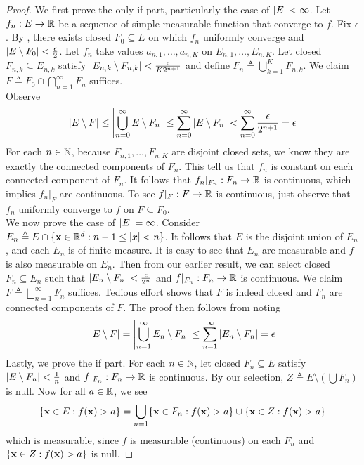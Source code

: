 \documentclass{report}
\begin{document}
\begin{proof}
We first prove the only if part, particularly the case of $\left|E\right|<\infty$. Let $f_n:E\rightarrow \mathbb{R}$ be a sequence of simple measurable function that converge to  $f$. Fix $\epsilon $. By , there exists closed $F_0\subseteq E$ on which $f_n$ uniformly converge and  $\left|E\setminus F_0\right|< \frac{\epsilon}{2}$. Let $f_n$ take values  $a_{n,1},\dots ,a_{n,K}$ on $E_{n,1},\dots ,E_{n,K}$. Let closed $F_{n,k}\subseteq E_{n,k}$ satisfy $\left|E_{n,k} \setminus F_{n,k}\right|< \frac{\epsilon }{K2^{n+1}}$ and define $F_n\triangleq \bigcup_{k=1}^K F_{n,k}$. We claim $F\triangleq F_0\cap \bigcap_{n=1}^{\infty}F_n$ suffices.\\

Observe 
\begin{align*}
\left|E\setminus F\right|\leq \left|\bigcup_{n=0}^{\infty} E\setminus F_n\right|\leq  \sum_{n=0}^{\infty} \left|E\setminus F_n\right|< \sum_{n=0}^{\infty} \frac{\epsilon }{2^{n+1}}=\epsilon 
\end{align*}
For each $n\in\mathbb{N}$, because $F_{n,1},\dots ,F_{n,K}$ are disjoint closed sets, we know they are exactly the connected components of  $F_n$. This tell us that $f_n$ is constant on each connected component of $F_n$. It follows that  $f_n|_{F_n}:F_n\rightarrow \mathbb{R}$ is continuous, which implies $f_n|_F$ are continuous. To see $f|_F:F\rightarrow \mathbb{R}$ is continuous, just observe that $f_n$ uniformly converge to $f$ on  $F\subseteq F_0$.  \\

We now prove the case of $\left|E\right|=\infty$. Consider  $E_n\triangleq E \cap \{ \textbf{x}\in\mathbb{R}^d:n-1 \leq \left|x\right|<n \}$. It follows that $E$ is the disjoint union of  $E_n$, and each  $E_n$ is of finite measure. It is easy to see that  $E_n$ are measurable and $f$ is  also measurable on $E_n$. Then from our earlier result, we can select closed $F_n\subseteq E_n$ such that $\left|E_n\setminus F_n\right|< \frac{\epsilon}{2^n}$ and $f|_{F_n}:F_n\rightarrow \mathbb{R}$ is continuous. We claim $F\triangleq \bigsqcup_{n=1}^{\infty}F_n$ suffices. Tedious effort shows that $F$ is indeed closed and $F_n$ are connected components of  $F$. The proof then follows from noting 
\begin{align*}
\left|E\setminus F\right|= \left|\bigcup_{n=1}^{\infty} E_n\setminus F_n\right|\leq \sum_{n=1}^{\infty} \left|E_n\setminus F_n\right|=\epsilon 
\end{align*}
Lastly, we prove the if part. For each $n\in\mathbb{N}$, let closed $F_n \subseteq E$ satisfy $\left|E\setminus F_n\right|< \frac{1}{n}$ and $f|_{F_n}:F_n\rightarrow \mathbb{R}$ is continuous. By our selection, $Z\triangleq E\setminus (\bigcup F_n)$ is null. Now for all $a\in\mathbb{R}$, we see
\begin{align*}
\{ \textbf{x}\in E: f(\textbf{x})>a \}=\bigcup_{n=1} \{ \textbf{x}\in F_n:f(\textbf{x})>a \}\cup \{ \textbf{x}\in Z:f(\textbf{x})>a \}
\end{align*}
which is measurable, since $f$ is measurable  (continuous) on each $F_n$ and  $\{ \textbf{x}\in Z:f(\textbf{x})>a \}$ is null.
\end{proof}
\end{document}
